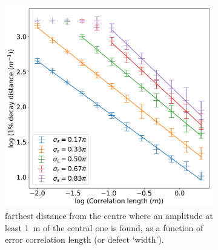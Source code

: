 \documentclass{article}
\begin{document}
\begin{figure}
\begin{subfigure}{0.47\textwidth}
        \includegraphics[width=\textwidth]{pictures/corr/dist.pdf}
        \caption{farthest distance from the centre where an amplitude at least \SI{1}{m} of the central one is found, as a function of error correlation length (or defect `width').}
    \end{subfigure}
    \caption{}
    \label{}
\end{figure}
\end{document}
